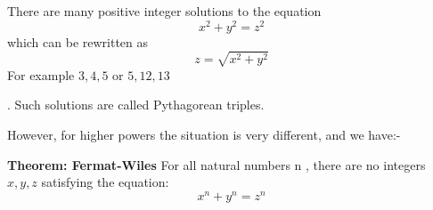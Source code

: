 \documentclass[a4paper]{article}
\begin{document}
There are many positive integer solutions to the equation 
\[x^2+y^2=z^2\]
which can be rewritten as \[z = \sqrt{x^2+y^2}\]
For example \(3,4,5\) or \(5,12,13\)

. Such solutions are called Pythagorean triples.

However, for higher powers the situation is very different, and we have:-

\textbf{Theorem: Fermat-Wiles} For all natural numbers n
, there are no integers \(x,y,z\) satisfying the equation: \[x^n+y^n=z^n\]
\end{document}
